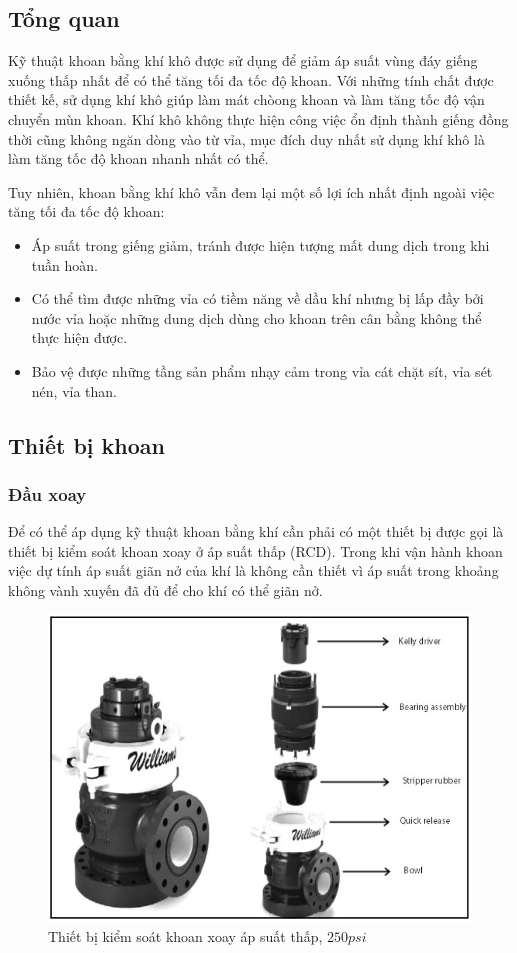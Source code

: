 \documentclass[13pt,a4paper]{article}
\begin{document}
\subsection{Tổng quan}
	Kỹ thuật khoan bằng khí khô được sử dụng để giảm áp suất vùng đáy giếng xuống thấp nhất để có thể tăng tối đa tốc độ khoan. Với những tính chất được thiết kế, sử dụng khí khô giúp làm mát chòong khoan và làm tăng tốc độ vận chuyển mùn khoan. Khí khô không thực hiện công việc ổn định thành giếng đồng thời cũng không ngăn dòng vào từ vỉa, mục đích duy nhất sử dụng khí khô là làm tăng tốc độ khoan nhanh nhất có thể.\par
	Tuy nhiên, khoan bằng khí khô vẫn đem lại một số lợi ích nhất định ngoài việc tăng tối đa tốc độ khoan:
	\begin{itemize}
	\item{Áp suất trong giếng giảm, tránh được hiện tượng mất dung dịch trong khi tuần hoàn.}
	\item{Có thể tìm được những vỉa có tiềm năng về dầu khí nhưng bị lấp đầy bởi nước vỉa hoặc những dung dịch dùng cho khoan trên cân bằng không thể thực hiện được.}
	\item{Bảo vệ được những tầng sản phẩm nhạy cảm trong vỉa cát chặt sít, vỉa sét nén, vỉa than.}
	\end{itemize}
\subsection{Thiết bị khoan}
\subsubsection{Đầu xoay}
	Để có thể áp dụng kỹ thuật khoan bằng khí cần phải có một thiết bị được gọi là thiết bị kiểm soát khoan xoay ở áp suất thấp (RCD). Trong khi vận hành khoan việc dự tính áp suất giãn nở của khí là không cần thiết vì áp suất trong khoảng không vành xuyến đã đủ để cho khí có thể giãn nở. 
	\begin{figure}[h]
	\centering
	\includegraphics[scale=.7]{Figs/Fig2.PNG}
	\caption{Thiết bị kiểm soát khoan xoay áp suất thấp, $250 psi$}
	\end{figure}
\end{document}
